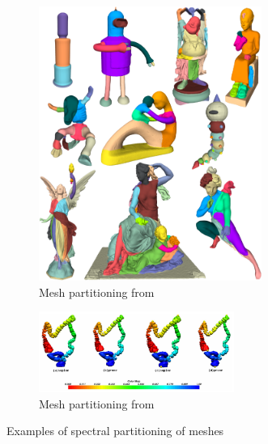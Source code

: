 \documentclass[11pt]{article}
\begin{document}
\begin{figure}
    \centering
    \begin{subfigure}[t]{0.5\textwidth}
        \centering
        \includegraphics[width=0.8\textwidth]{spectral_partitioning.png}
        \caption{Mesh partitioning from \cite{bao2023spectral}}
    \end{subfigure}\hfill

    \vspace{1cm}
    \begin{subfigure}[t]{0.7\textwidth}
        \centering
        \includegraphics[width=0.7\textwidth]{fielder_vector_colon.png}
        \caption{Mesh partitioning from \cite{10.1007/978-3-642-15705-9_41}}
   \end{subfigure}
    \caption{Examples of spectral partitioning of meshes}
    \label{fig:spectral_part}
\end{figure}

\newpage
\printbibliography
\end{document}
